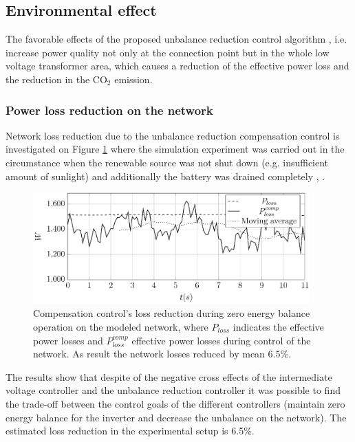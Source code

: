     \subsection{Environmental effect}\label{VUB:sec:Environment}

    The favorable effects of the proposed unbalance reduction control algorithm , i.e. increase power quality not only at the connection point but in the whole low voltage transformer area, which causes a reduction of the effective power loss and the reduction in the CO${}_2$ emission.

        \subsubsection{Power loss reduction on the network}\label{VUB:sec:Powerloss}

             Network loss reduction due to the unbalance reduction compensation control is investigated on Figure \ref{fig:compare_power} where the simulation experiment was carried out in the circumstance when the renewable source was not shut down (e.g. insufficient amount of sunlight) and additionally the battery was drained completely  \cite{Neukirchner2015}, \cite{neukirchner2015examination}.

            \begin{figure}[ht]
            \centering
            \includegraphics[width=0.95\textwidth]{Unblance_EPS_Pics/UnbalRedComp_JCP-figure6.eps}
            \caption{Compensation control's loss reduction during zero energy balance operation on the modeled network, where $P_{loss}$ indicates the effective power losses and $P^{comp}_{loss}$ effective power losses during control of the network. As result the network losses reduced by mean $6.5\%$.}
            \label{fig:compare_power}
            \end{figure}

            The results show that despite of the negative cross effects of the intermediate voltage controller and the unbalance reduction controller it was possible to find the trade-off between the control goals of the different controllers (maintain zero energy balance for the inverter and decrease the unbalance on the network). The estimated loss reduction in the experimental setup is 6.5\%.

